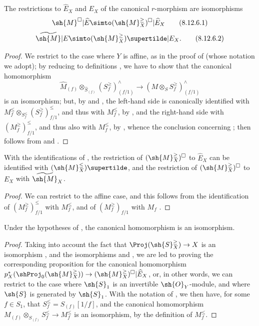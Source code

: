 \begin{proposition}[8.12.6]
\label{II.8.12.6}
The restrictions to $\widehat{E}_X$ and $E_X$ of the canonical $r$-morphism  are isomorphisms
\[
\label{II.8.12.6.1}
    \sh{M}^\square|\widehat{E} \simto (\sh{M}_X^\geq)^\square|\widehat{E}_X
\tag{8.12.6.1}
\]
\[
\label{II.8.12.6.2}
    \widetilde{\sh{M}}|E \simto (\sh{M}_X^\geq)\supertilde|E_X.
\tag{8.12.6.2}
\]
\end{proposition}

\begin{proof}
We restrict to the case where $Y$ is affine, as in the proof of  (whose notation we adopt);
by reducing to definitions , we have to show that the canonical homomorphism
\[
    \widehat{M}_{(f)}\otimes_{\widehat{S}_{(f)}}(S_f^\geq)_{(f/1)}^\wedge \to (M\otimes_S S_f^\geq)_{(f/1)}^\wedge
\]
is an isomorphism;
but, by  and , the left-hand side is canonically identified with $M_f^\leq\otimes_{S_f^\leq}(S_f^\geq)_{f/1}^\leq$, and thus with $M_f^\leq$, by , and the right-hand side with $(M_f^\geq)_{f/1}^\leq$, and thus also with $M_f^\leq$, by , whence the conclusion concerning ;
 then follows from  and .
\end{proof}

\begin{corollary}[8.12.7]
\label{II.8.12.7}
With the identifications of , the restriction of $(\sh{M}_X^\geq)^\square$ to $\widehat{E}_X$ can be identified with $(\sh{M}_X^\leq)\supertilde$, and the restriction of $(\sh{M}_X^\geq)^\square$ to $E_X$ with $\widetilde{\sh{M}}_X$.
\end{corollary}

\begin{proof}
We can restrict to the affine case, and this follows from the identification of $(M_f^\geq)_{f/1}^\leq$ with $M_f^\leq$, and of $(M_f^\geq)_{f/1}$ with $M_f$ .
\end{proof}

\begin{proposition}[8.12.8]
\label{II.8.12.8}
Under the hypotheses of , the canonical homomorphism  is an isomorphism.
\end{proposition}

\begin{proof}
Taking into account the fact that $\Proj(\sh{S}_X^\geq)\to X$ is an isomorphism , and the
isomorphisms  and , we are led to proving the corresponding proposition for the canonical homomorphism $p_X^*(\shProj_0(\sh{M}_X^\geq))\to(\sh{M}_X^\geq)^\square|\widehat{E}_X$, or, in other words, we can restrict to the case where $\sh{S}_1$ is an invertible $\sh{O}_Y$-module, and where $\sh{S}$ is generated by $\sh{S}_1$.
With the notation of , we then have, for some $f\in S_1$, that $S_f^\leq=S_{(f)}[1/f]$, and the canonical homomorphism $M_{(f)}\otimes_{S_{(f)}}S_f^\leq\to M_f^\leq$ is an isomorphism, by the definition of $M_f^\leq$.
\end{proof}


